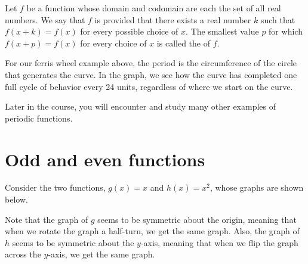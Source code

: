 \documentclass[nooutcomes]{ximera}
\begin{document}
\begin{definition}
Let $f$ be a function whose domain and codomain %
are each the set of all real numbers. We say that $f$ is  provided that there exists a real number $k$ such that $f(x + k) = f(x)$ for every possible choice of $x$. The smallest value $p$ for which $f(x + p) = f(x)$ for every choice of $x$ is called the  of $f$.

\end{definition}

For our ferris wheel example above, the period is the circumference of the circle that generates the curve. In the graph, we see how the curve has completed one full cycle of behavior every 24 units, regardless of where we start on the curve.

Later in the course, you will encounter and study many other examples of periodic functions.
 



\section{Odd and even functions}

Consider the two functions, $g(x) = x$ and $h(x) = x^2$, whose graphs are shown below.
\begin{image}

\end{image}

Note that the graph of $g$ seems to be symmetric about the origin, meaning that when we rotate the graph a half-turn, we get the same graph. Also, the graph of $h$ seems to be symmetric about the $y$-axis, meaning that when we flip the graph across the $y$-axis, we get the same graph. 
\end{document}

